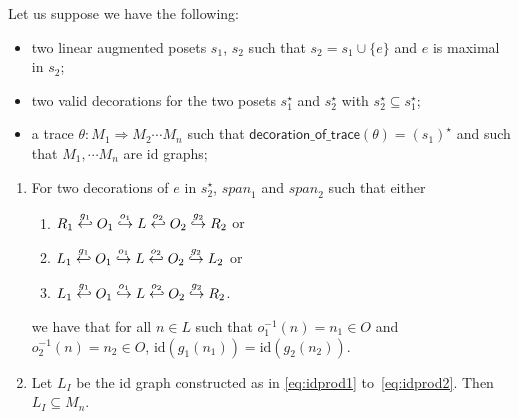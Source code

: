 \begin{lemma}
  Let us suppose we have the following:
  \begin{itemize}
  \item two linear augmented posets $s_1$, $s_2$ such that $s_2=s_1\cup\{e\}$ and $e$ is maximal in $s_2$;
  \item two valid decorations for the two posets $s_1^{\star}$ and $s_2^{\star}$ with $s_2^{\star}\subseteq s_1^{\star}$;
  \item a trace $\theta:M_1\Rightarrow M_2\cdots M_n$ such that $\mathsf{decoration\_of\_trace}(\theta)=(s_1)^{\star}$ and such that $M_1,\cdots M_n$ are id graphs;
  \end{itemize}
  \begin{enumerate}
  \item For two decorations of $e$ in $s_2^{\star}$, $\mathit{span}_1$ and $\mathit{span}_2$ such that either
    \begin{enumerate}
    \item $R_1 \overset{g_1}{\hookleftarrow} O_1 \overset{o_1}{\hookrightarrow} L \overset{o_2}{\hookleftarrow} O_2\overset{g_2}{\hookrightarrow} R_2$ or
    \item $L_1 \overset{g_1}{\hookleftarrow} O_1 \overset{o_1}{\hookrightarrow} L \overset{o_2}{\hookleftarrow} O_2\overset{g_2}{\hookrightarrow} L_2$ or
    \item $L_1 \overset{g_1}{\hookleftarrow} O_1 \overset{o_1}{\hookrightarrow} L \overset{o_2}{\hookleftarrow} O_2\overset{g_2}{\hookrightarrow} R_2$.
    \end{enumerate}
    we have that for all $n\in L$ such that $o_1^{-1}(n) = n_1\in O$ and $o_2^{-1}(n) = n_2\in O$, $\text{id}(g_1(n_1)) = \text{id}(g_2(n_2))$.
  \item Let $L_I$ be the id graph constructed as in \autoref{eq:idprod1} to~\autoref{eq:idprod2}. Then $L_I\subseteq M_n$.
\end{enumerate}
\end{lemma}

